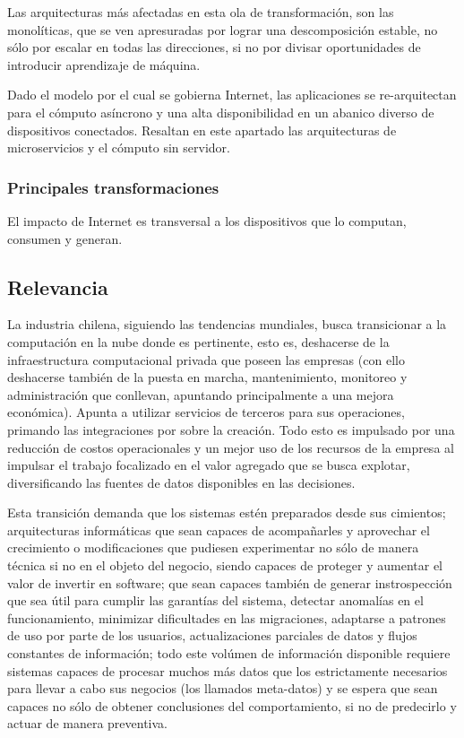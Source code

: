   Las arquitecturas más afectadas en esta ola de transformación, son las monolíticas, que se ven apresuradas por lograr una descomposición estable, no sólo por escalar en todas las direcciones, si no por divisar oportunidades de introducir aprendizaje de máquina.

  Dado el modelo por el cual se gobierna Internet, las aplicaciones se re-arquitectan para el cómputo asíncrono y una alta disponibilidad en un abanico diverso de dispositivos conectados. Resaltan en este apartado las arquitecturas de microservicios y el cómputo sin servidor.


\subsubsection{Principales transformaciones}

El impacto de Internet es transversal a los dispositivos que lo computan, consumen y generan.

\subsection{Relevancia} %
\label{sub:relevancia}

La industria chilena, siguiendo las tendencias mundiales, busca transicionar a la computación en la nube donde es pertinente, esto es, deshacerse de la infraestructura computacional privada que poseen las empresas (con ello deshacerse también de la puesta en marcha, mantenimiento, monitoreo y administración que conllevan, apuntando principalmente a una mejora económica). Apunta a utilizar servicios de terceros para sus operaciones, primando las integraciones por sobre la creación. Todo esto es impulsado por una reducción de costos operacionales y un mejor uso de los recursos de la empresa al impulsar el trabajo focalizado en el valor agregado que se busca explotar, diversificando las fuentes de datos disponibles en las decisiones.

Esta transición demanda que los sistemas estén preparados desde sus cimientos; arquitecturas informáticas que sean capaces de acompañarles y aprovechar el crecimiento o modificaciones que pudiesen experimentar no sólo de manera técnica si no en el objeto del negocio, siendo capaces de proteger y aumentar el valor de invertir en software; que sean capaces también de generar instrospección que sea útil para cumplir las garantías del sistema, detectar anomalías en el funcionamiento, minimizar dificultades en las migraciones, adaptarse a patrones de uso por parte de los usuarios, actualizaciones parciales de datos y flujos constantes de información; todo este volúmen de información disponible requiere sistemas capaces de procesar muchos más datos que los estrictamente necesarios para llevar a cabo sus negocios (los llamados meta-datos) y se espera que sean capaces no sólo de obtener conclusiones del comportamiento, si no de predecirlo y actuar de manera preventiva.

